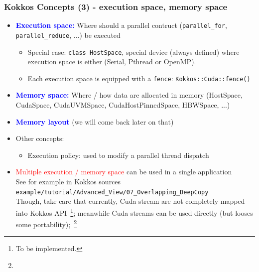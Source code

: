 \begin{frame}
  \frametitle{Kokkos Concepts (3) - execution space, memory space}

  \begin{itemize}
  \item \textcolor{blue}{\textbf{Execution space:}} Where should a parallel contruct (\texttt{parallel\_for}, \texttt{parallel\_reduce}, ...) be executed\\
    \begin{itemize}
    \item Special case: \texttt{class HostSpace}, special device (always defined) where execution space is either (Serial, Pthread or OpenMP).
    \item Each execution space is equipped with a \texttt{fence}: \texttt{Kokkos::Cuda::fence()}
    \end{itemize}
  \item \textcolor{blue}{\textbf{Memory space:}} Where / how data are allocated in memory (HostSpace, CudaSpace, CudaUVMSpace, CudaHostPinnedSpace, HBWSpace, ...)
  \item \textcolor{blue}{\textbf{Memory layout}} (we will come back later on that)
  \item Other concepts:
    \begin{itemize}
    \item Execution policy: used to modify a parallel thread dispatch
    \end{itemize}
  \item \textcolor{red}{Multiple execution / memory space} can be used in a single application\\
    See for example in Kokkos sources \texttt{example/tutorial/Advanced\_View/07\_Overlapping\_DeepCopy}\\
    Though, take care that currently, Cuda stream are not completely mapped into Kokkos API~\footnote{To be implemented.}; meanwhile Cuda streams can be used directly (but looses some portability);~\footnote{} 
  \end{itemize}

\end{frame}

